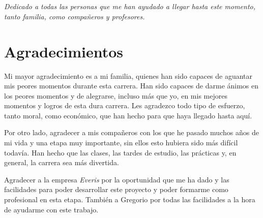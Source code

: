 \documentclass[a4paper, 12pt]{book}
\begin{document}
\newpage
\mbox{}
\thispagestyle{empty} %




\chapter*{}
\begin{flushright}
\textit{Dedicado a todas las personas que me han ayudado a llegar hasta este momento, tanto familia, como compañeros y profesores.}
\end{flushright}


\chapter*{Agradecimientos}

Mi mayor agradecimiento es a mi familia, quienes han sido capaces de aguantar mis peores momentos durante esta carrera. Han sido capaces de darme ánimos en los peores momentos y de alegrarse, incluso más que yo, en mis mejores momentos y logros de esta dura carrera. Les agradezco todo tipo de esfuerzo, tanto moral, como económico, que han hecho para que haya llegado hasta aquí.

\vspace{5mm}
Por otro lado, agradecer a mis compañeros con los que he pasado muchos años de mi vida y una etapa muy importante, sin ellos esto hubiera sido más difícil todavía. Han hecho que las clases, las tardes de estudio, las prácticas y, en general, la carrera sea más divertida.

\vspace{5mm}
Agradecer a la empresa \textit{Everis} por la oportunidad que me ha dado y las facilidades para poder desarrollar este proyecto y poder formarme como profesional en esta etapa. También a Gregorio por todas las facilidades a la hora de ayudarme con este trabajo.
\end{document}
